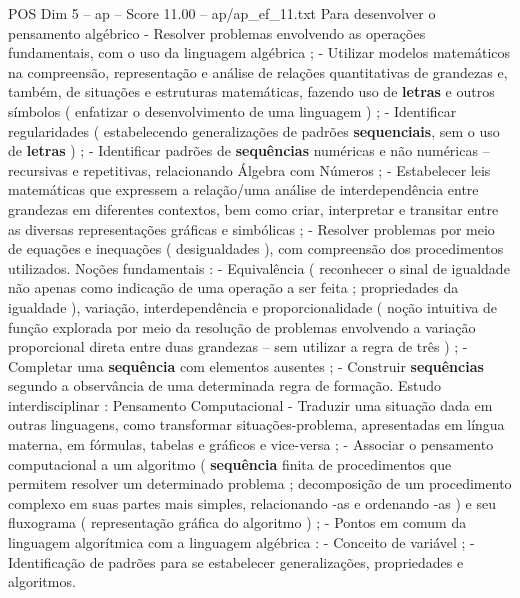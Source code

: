 \begin{textsample}{POS Dim 5 – ap – Score 11.00 – ap/ap\_ef\_11.txt}
Para desenvolver o pensamento algébrico - Resolver problemas envolvendo as operações fundamentais, com o uso da linguagem algébrica ; - Utilizar modelos matemáticos na compreensão, representação e análise de relações quantitativas de grandezas e, também, de situações e estruturas matemáticas, fazendo uso de \textbf{letras} e outros símbolos ( enfatizar o desenvolvimento de uma linguagem ) ; - Identificar regularidades ( estabelecendo generalizações de padrões \textbf{sequenciais}, sem o uso de \textbf{letras} ) ; - Identificar padrões de \textbf{sequências} numéricas e não numéricas – recursivas e repetitivas, relacionando Álgebra com Números ; - Estabelecer leis matemáticas que expressem a relação/uma análise de interdependência entre grandezas em diferentes contextos, bem como criar, interpretar e transitar entre as diversas representações gráficas e simbólicas ; - Resolver problemas por meio de equações e inequações ( desigualdades ), com compreensão dos procedimentos utilizados.
Noções fundamentais : - Equivalência ( reconhecer o sinal de igualdade não apenas como indicação de uma operação a ser feita ; propriedades da igualdade ), variação, interdependência e proporcionalidade ( noção intuitiva de função explorada por meio da resolução de problemas envolvendo a variação proporcional direta entre duas grandezas – sem utilizar a regra de três ) ; - Completar uma \textbf{sequência} com elementos ausentes ; - Construir \textbf{sequências} segundo a observância de uma determinada regra de formação.
Estudo interdisciplinar : Pensamento Computacional - Traduzir uma situação dada em outras linguagens, como transformar situações-problema, apresentadas em língua materna, em fórmulas, tabelas e gráficos e vice-versa ; - Associar o pensamento computacional a um algoritmo ( \textbf{sequência} finita de procedimentos que permitem resolver um determinado problema ; decomposição de um procedimento complexo em suas partes mais simples, relacionando -as e ordenando -as ) e seu fluxograma ( representação gráfica do algoritmo ) ; - Pontos em comum da linguagem algorítmica com a linguagem algébrica : - Conceito de variável ; - Identificação de padrões para se estabelecer generalizações, propriedades e algoritmos.

\end{textsample}
